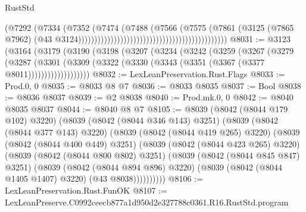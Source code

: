 \begin{lexlean}{RustStd}
\begin{coremodule}
                                                                            (@7292
                                                                              (@7334
                                                                                (@7352
                                                                                  (@7474
                                                                                    (@7488
                                                                                      (@7566
                                                                                        (@7575
                                                                                          (@7861
                                                                                            (@3125
                                                                                              (@7865
                                                                                                @7962)
                                                                                              (@43
                                                                                                @3124))))))))))))))))))))))))))))))))))))))))))))))
@8031 := @3123
    (@3164
      (@3179
        (@3190
          (@3198
            (@3207
              (@3234
                (@3242
                  (@3259
                    (@3267
                      (@3279
                        (@3287
                          (@3301
                            (@3309
                              (@3322 (@3330 (@3343 (@3351 (@3367 (@3377 @8011)))))))))))))))))))
@8032 := LexLeanPreservation.Rust.Flags
@8033 := Prod.{0, 0}
@8035 := @8033 @8 @7
@8036 := @8033 @8035
@8037 := Bool
@8038 := @8036 @8037
@8039 := @2 @8038
@8040 := Prod.mk.{0, 0}
@8042 := @8040 @8035 @8037
@8044 := @8040 @8 @7
@8105 := @8039
    (@8042 (@8044 @179 @102) @3220)
    (@8039
      (@8042 (@8044 @346 @143) @3251)
      (@8039
        (@8042 (@8044 @377 @143) @3220)
        (@8039
          (@8042 (@8044 @419 @265) @3220)
          (@8039
            (@8042 (@8044 @400 @449) @3251)
            (@8039
              (@8042 (@8044 @423 @265) @3220)
              (@8039
                (@8042 (@8044 @800 @802) @3251)
                (@8039
                  (@8042 (@8044 @845 @847) @3251)
                  (@8039
                    (@8042 (@8044 @894 @896) @3220)
                    (@8039 (@8042 (@8044 @1405 @1407) @3220) (@43 @8038))))))))))
@8106 := LexLeanPreservation.Rust.FunOK
@8107 := LexLeanPreserve.C0992ceecb877a1d950d2e327788c0361.R16.RustStd.program

\end{coremodule}
\end{lexlean}
